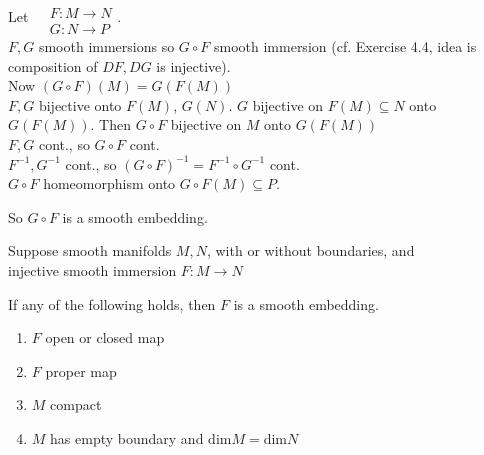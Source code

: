 Let $\begin{aligned} & \quad \\
    & F : M \to N \\
    & G:N \to P \end{aligned}$.  \\
$F,G$ smooth immersions so $G\circ F$ smooth immersion (cf. Exercise 4.4, idea is composition of $DF, DG$ is injective).  \\
Now $(G \circ F)(M) = G(F(M))$ \\
$F,G$ bijective onto $F(M)$, $G(N)$.  $G$ bijective on $F(M) \subseteq N$ onto $G(F(M))$.  Then $G\circ F$ bijective on $M$ onto $G(F(M))$ \\
$F,G$ cont., so $G\circ F $ cont.  \\
$F^{-1},G^{-1}$ cont., so $(G\circ F)^{-1}= F^{-1} \circ G^{-1}$ cont.  \\
$G\circ F$ homeomorphism onto $G\circ F(M) \subseteq P$.  

So $G\circ F$ is a smooth embedding.  


\begin{proposition}[4.22]
        Suppose smooth manifolds $M,N$, with or without boundaries, and \\
injective smooth immersion $F:M\to N$

If any of the following holds, then $F$ is a smooth embedding. 
\begin{enumerate}
        \item[(a)] $F$ open or closed map
        \item[(b)] $F$ proper map
        \item[(c)] $M$ compact
        \item[(d)] $M$ has empty boundary and $\text{dim}M = \text{dim}N$
\end{enumerate}
\end{proposition}
